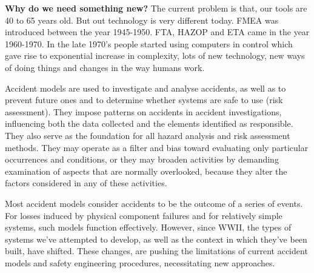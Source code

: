 \textbf{Why do we need something new?}
The current problem is that, our tools are 40 to 65 years old. But out technology is very different today. FMEA was introduced between the year 1945-1950. FTA, HAZOP and ETA came in the year 1960-1970. In the late 1970’s people started using computers in control which gave rise to exponential increase in complexity, lots of new technology, new ways of doing things and changes in the way humans work.


Accident models are used to investigate and analyse accidents, as well as to prevent future ones and to determine whether systems are safe to use (risk assessment). They impose patterns on accidents in accident investigations, influencing both the data collected and the elements identified as responsible. They also serve as the foundation for all hazard analysis and risk assessment methods. They may operate as a filter and bias toward evaluating only particular occurrences and conditions, or they may broaden activities by demanding examination of aspects that are normally overlooked, because they alter the factors considered in any of these activities.


Most accident models consider accidents to be the outcome of a series of events. For losses induced by physical component failures and for relatively simple systems, such models function effectively. However, since WWII, the types of systems we've attempted to develop, as well as the context in which they've been built, have shifted. These changes, are pushing the limitations of current accident models and safety engineering procedures, necessitating new approaches.



